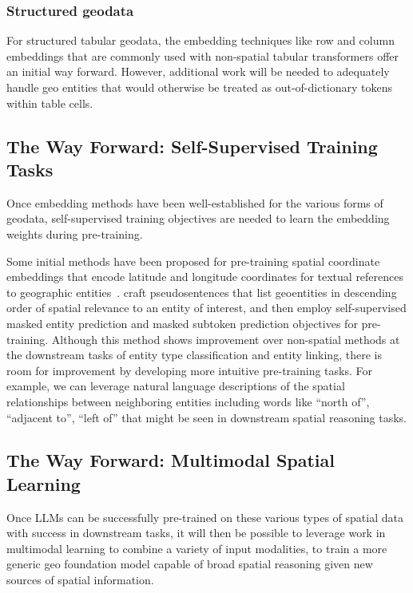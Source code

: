 \subsubsection{Structured geodata}  %
For structured tabular geodata, the embedding techniques like row and column embeddings that are commonly used with non-spatial tabular transformers offer an initial way forward.
However, additional work will be needed to adequately handle geo entities that would otherwise be treated as out-of-dictionary tokens within table cells.



\subsection{The Way Forward: Self-Supervised Training Tasks}
Once embedding methods have been well-established for the various forms of geodata, self-supervised training objectives are needed to learn the embedding weights during pre-training.

Some initial methods have been proposed for pre-training spatial coordinate embeddings that encode latitude and longitude coordinates for textual references to geographic entities~\cite{Li2021}.
\citeauthor{Li2021} craft pseudosentences that list geoentities in descending order of spatial relevance to an entity of interest, and then employ self-supervised masked entity prediction and masked subtoken prediction objectives for pre-training.
Although this method shows improvement over non-spatial methods at the downstream tasks of entity type classification and entity linking, there is room for improvement by developing more intuitive pre-training tasks.
For example, we can leverage natural language descriptions of the spatial relationships between neighboring entities including words like ``north of'', ``adjacent to'', ``left of'' that might be seen in downstream spatial reasoning tasks.



\subsection{The Way Forward: Multimodal Spatial Learning}
Once LLMs can be successfully pre-trained on these various types of spatial data with success in downstream tasks, it will then be possible to leverage work in multimodal learning to combine a variety of input modalities, to train a more generic geo foundation model capable of broad spatial reasoning given new sources of spatial information.


